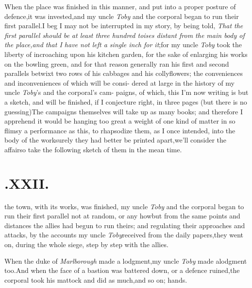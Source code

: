 \documentclass{article}
\begin{document}
When the place was finished in this 
manner, and put into a proper posture
of defence,\tsk it was invested,\tsk and my\break
uncle \textit{Toby} and the corporal began to run\break
their first parallel.\tsk I beg I may not\break
be interrupted in my story, by being\break
told, \textit{That the first parallel should be at least three
hundred toises distant from the main body of the place,\tsk and
that I have not left a single inch for it};\tsh for my
uncle \textit{Toby} took the liberty of incroaching upon his
kitchen garden, for the sake of enlarging his works on the
bowling green, and for that reason generally ran his first and
second parallels betwixt two rows of his cabbages and his
collyflowers; the conveniences and inconveniences of which will be
consi- dered at large in the history of my\break
uncle \textit{Toby}’s and the corporal’s cam-\break
paigns, of which,
this I’m now writing is but a sketch, and will be finished,
if\break
I conjecture right, in three pages (but there is no
guessing)\tsh The campaigns themselves will take up as
many books; and therefore I apprehend it would be hanging too great
a weight of one kind of matter in so flimsy a performance as this,
to rhapsodize them, as I once intended, into the body of the
work\tsh surely they had better be printed
apart,\break\tsh we’ll consider the affair\tsh so
take the following sketch of them in the mean time.

\etp

\section{.\enspace XXII.}

 the town, with its works,\break
was finished, my uncle \textit{Toby}\break
and the corporal began to run their first
parallel \tsh not at random, or any how\break \tsh but from the
same points and distances the allies had begun to run theirs;
and regulating their approaches and attacks, by the accounts my
uncle \textit{Toby}\break received from the daily papers,\tsk they
went on, during the whole siege, step by step with the allies.

When the duke of \textit{Marlborough} made a
lodgment,\tsh my uncle \textit{Toby} made a\break lodgment
too.\tsh And when the face of a bastion was battered down,
or a defence ruined,\tsk the corporal took his mattock and did as
much,\tsk and so on;\break
{}
\break
hands.
\end{document}

